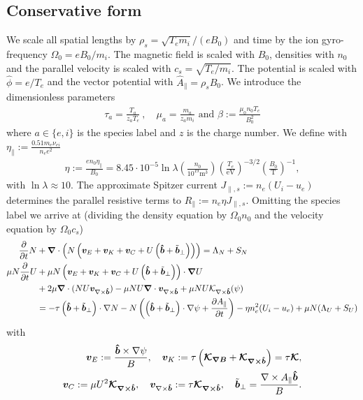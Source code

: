 \subsection{Conservative form}
We scale all spatial lengths by $\rho_s = \sqrt{T_e m_i}/(eB_0)$ and time by the ion gyro-frequency $\Omega_0 = eB_0/m_i$.
The magnetic field is scaled with $B_0$, densities with $n_0$ and the parallel velocity is scaled with $c_s = \sqrt{T_e/m_i}$.
The potential is scaled with $\hat \phi = e/T_e$ and the vector potential with
$\hat A_\parallel = \rho_s B_0$.
We introduce the dimensionless parameters
\begin{align}
  \tau_a = \frac{T_a}{z_aT_e}~,\quad \mu_a = \frac{m_a}{z_am_i}\text{ and } 
  \beta:=\frac{\mu_0 n_0 T_e}{B_0^2}
  \label{}
\end{align}
where $a\in\{e,i\}$ is the species label and $z$ is the charge number. We define with 
$\eta_\parallel := \frac{0.51 m_e \nu_{ei}}{n_e e^2}$
\begin{align}
  \eta:=\frac{en_0\eta_\parallel}{B_0} = 8.45\cdot 10^{-5}\ln \lambda \left(\frac{n_0}{10^{19}\text{m}^3}\right) \left(\frac{T_e}{\text{eV}}\right)^{-3/2} \left(\frac{B_0}{\text{T}}\right)^{-1},
    \label{eq:resistivity}
\end{align}
with $\ln \lambda \approx 10$.
 The approximate Spitzer current \(J_{\parallel,s}:= n_e \left(U_i - u_e\right)\)
 determines the parallel resistive terms to $R_\parallel:= n_e\eta J_{\parallel,s}$.
Omitting the species label we arrive at (dividing the density equation by $\Omega_0n_0$ and the velocity equation by $\Omega_0 c_s$)
\begin{align}
\frac{\partial}{\partial t} N &+ {\boldsymbol{\nabla}}\cdot\left( N \left(
    {\boldsymbol{v}}_E + {\boldsymbol{v}}_K + {\boldsymbol{v}}_{C} + U\left(\bm{\hat{b}} + \tilde{{\boldsymbol{b}}}_\perp\right)\right)\right) = \Lambda_N + S_N \\
\mu N \frac{\partial}{\partial t} U &+ \mu N \left(
    {\boldsymbol{v}}_E + {\boldsymbol{v}}_K + {\boldsymbol{v}}_{C} + U\left(\bm{\hat{b}} + \tilde{{\boldsymbol{b}}}_\perp\right)
    \right)\cdot {\boldsymbol{\nabla}} U  \nonumber \\
    &+ 2\mu {\boldsymbol{\nabla}} \cdot ( NU {\boldsymbol{v}}_{\nabla\times\bm{\hat{b}}})
    -\mu NU{\boldsymbol{\nabla}}\cdot {\boldsymbol{v}}_{\nabla\times\bm{\hat{b}}}
    + \mu NU\mathcal K_{\nabla\times\bm{\hat{b}}}(\psi) \nonumber\\
    &= -\tau \left(\bm{\hat{b}} + \tilde{{\boldsymbol{b}}}_\perp\right)\cdot \nabla N 
    -N \left( \left(\bm{\hat{b}}+\tilde{{\boldsymbol{b}}}_\perp\right)\cdot \nabla \psi + \frac{\partial A_\parallel}{\partial t}\right) 
    - \eta n_e^2(U_i-u_e) + \mu N(\Lambda_U + S_U)
\label{}
\end{align}
with
\begin{align}
{\boldsymbol{v}}_E := \frac{\bm{\hat{b}}\times\nabla\psi}{B},\quad
{\boldsymbol{v}}_{K} := \tau \left({\boldsymbol{\mathcal K_{\nabla B}}} + {\boldsymbol{\mathcal K_{\nabla\times\bm{\hat{b}}}}}\right)=\tau{\boldsymbol{\mathcal K}}  ,\nonumber\\
{\boldsymbol{v}}_C := \mu U^2{\boldsymbol{\mathcal K_{\nabla\times\bm{\hat{b}}}}},\quad
{\boldsymbol{v}}_{\nabla\times\bm{\hat{b}}} := \tau{\boldsymbol{\mathcal K_{\nabla\times\bm{\hat{b}}}}},\quad
\tilde{{\boldsymbol{b}}}_\perp = \frac{\nabla\times A_\parallel \bm{\hat{b}}}{B}.
\label{}
\end{align}

